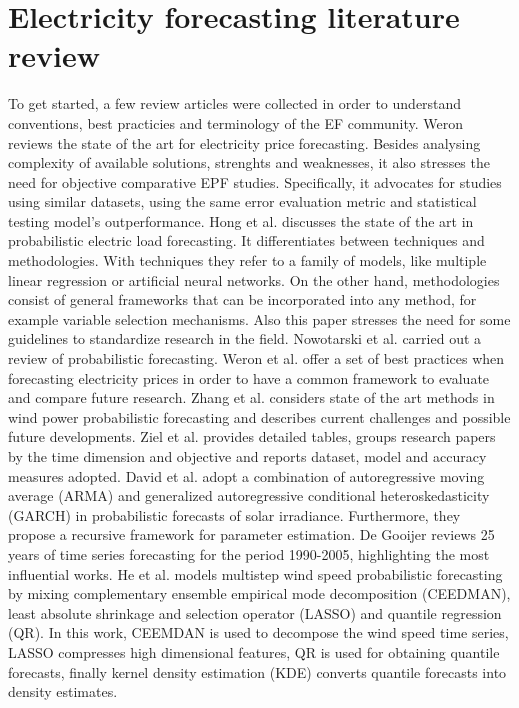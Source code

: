 \section{Electricity forecasting literature review}
To get started, a few review articles were collected in order to understand conventions, best practicies and terminology of the EF community.
Weron \cite{EPF_review} reviews the state of the art for electricity price forecasting. Besides analysing complexity of available solutions, strenghts and weaknesses, it also stresses the need for objective comparative EPF studies. Specifically, it advocates for studies using similar datasets, using the same error evaluation metric and statistical testing model's outperformance.
Hong et al. \cite{prob_elf} discusses the state of the art in probabilistic electric load forecasting. It differentiates between techniques and methodologies. With techniques they refer to a family of models, like multiple linear regression or artificial neural networks. On the other hand, methodologies consist of general frameworks that can be incorporated into any method, for example variable selection mechanisms. Also this paper stresses the need for some guidelines to standardize research in the field.
Nowotarski et al. \cite{nowotarski} carried out a review of probabilistic forecasting.
Weron et al. \cite{lago} offer a set of best practices when forecasting electricity prices in order to have a common framework to evaluate and compare future research.
Zhang et al. \cite{zhang2014review} considers state of the art methods in wind power probabilistic forecasting and describes current challenges and possible future developments.
Ziel et al. \cite{ziel2018probabilistic} provides detailed tables, groups research papers by the time dimension and objective and reports dataset, model and accuracy 
measures adopted.
David et al. \cite{david2016probabilistic} adopt a combination of autoregressive moving average (ARMA) and generalized autoregressive conditional heteroskedasticity (GARCH) in probabilistic forecasts of solar irradiance. Furthermore, they propose a recursive framework for parameter estimation.
De Gooijer \cite{de200625} reviews 25 years of time series forecasting for the period 1990-2005, highlighting the most influential works.
He et al. \cite{he2022cooperative} models  multistep wind speed probabilistic forecasting by mixing complementary ensemble empirical mode decomposition (CEEDMAN), least absolute shrinkage and selection operator (LASSO) and quantile regression (QR). In this work, CEEMDAN is used to decompose the wind speed time series, LASSO compresses high dimensional features, QR is used for obtaining quantile forecasts, finally kernel density estimation (KDE) converts quantile forecasts into density estimates.
